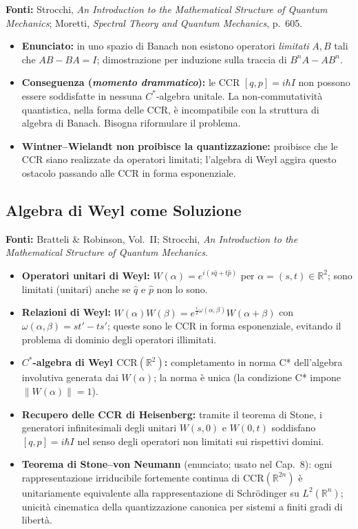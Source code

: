 \documentclass[12pt, a4paper]{article}
\newcommand{\fonti}[1]{%
	\begin{fontebox}
		\textcolor{fontecolor}{\footnotesize\textbf{Fonti:} #1}
	\end{fontebox}%
}
\begin{document}
	\fonti{Strocchi, \textit{An Introduction to the Mathematical Structure of Quantum
			Mechanics}; Moretti, \textit{Spectral Theory and Quantum Mechanics}, p.~605.}
	
	\begin{itemize}
		\item \textbf{Enunciato:} in uno spazio di Banach non esistono operatori
		\emph{limitati} $A, B$ tali che $AB - BA = I$; dimostrazione per induzione
		sulla traccia di $B^n A - AB^n$.
		\item \textbf{Conseguenza (\textit{momento drammatico}):} le CCR $[q,p] = i\hbar I$
		non possono essere soddisfatte in nessuna $C^*$-algebra unitale. La
		non-commutatività quantistica, nella forma delle CCR, è incompatibile con la
		struttura di algebra di Banach. Bisogna riformulare il problema.
		\item \textbf{Wintner--Wielandt non proibisce la quantizzazione:} proibisce
		che le CCR siano realizzate da operatori limitati; l'algebra di Weyl aggira
		questo ostacolo passando alle CCR in forma esponenziale.
	\end{itemize}
	
	\subsection{Algebra di Weyl come Soluzione}
	
	\fonti{Bratteli \& Robinson, Vol.~II; Strocchi, \textit{An Introduction to the
			Mathematical Structure of Quantum Mechanics}.}
	
	\begin{itemize}
		\item \textbf{Operatori unitari di Weyl:} $W(\alpha) = e^{i(s\hat{q} + t\hat{p})}$
		per $\alpha = (s, t) \in \mathbb{R}^2$; sono limitati (unitari) anche se $\hat{q}$
		e $\hat{p}$ non lo sono.
		\item \textbf{Relazioni di Weyl:} $W(\alpha)W(\beta) = e^{\frac{i}{2}\omega(\alpha,\beta)}
		W(\alpha + \beta)$ con $\omega(\alpha,\beta) = st' - ts'$; queste sono le CCR
		in forma esponenziale, evitando il problema di dominio degli operatori illimitati.
		\item \textbf{$C^*$-algebra di Weyl $\mathrm{CCR}(\mathbb{R}^2)$:} completamento
		in norma C* dell'algebra involutiva generata dai $W(\alpha)$; la norma è unica
		(la condizione C* impone $\|W(\alpha)\| = 1$).
		\item \textbf{Recupero delle CCR di Heisenberg:} tramite il teorema di Stone,
		i generatori infinitesimali degli unitari $W(s, 0)$ e $W(0, t)$ soddisfano
		$[q, p] = i\hbar I$ nel senso degli operatori non limitati sui rispettivi domini.
		\item \textbf{Teorema di Stone--von Neumann} (enunciato; usato nel Cap.~8): ogni
		rappresentazione irriducibile fortemente continua di $\mathrm{CCR}(\mathbb{R}^{2n})$
		è unitariamente equivalente alla rappresentazione di Schrödinger su
		$L^2(\mathbb{R}^n)$; unicità cinematica della quantizzazione canonica per sistemi
		a finiti gradi di libertà.
	\end{itemize}
	
\end{document}
